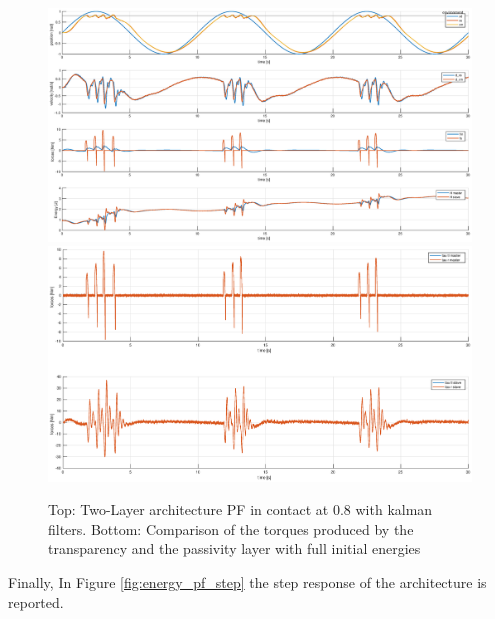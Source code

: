 \documentclass[a4paper,12pt]{article}
\begin{document}
\begin{figure}[H]
    \hspace*{-4.5cm}
    \includegraphics[scale=0.5]{images/energy_pf_kalman.eps}
    \qquad
    \hspace*{-1.5cm}
    \includegraphics[scale=0.4]{images/energy_pf_tau_kalman.eps}
    \caption{Top: Two-Layer architecture PF in contact at 0.8 with kalman filters. Bottom: Comparison of the torques produced by the transparency and the passivity layer with full initial energies}
    \label{fig:energy_pf_kalman}
\end{figure}
\newpage

Finally, In Figure \ref{fig:energy_pf_step} the step response of the architecture is reported.
\end{document}
